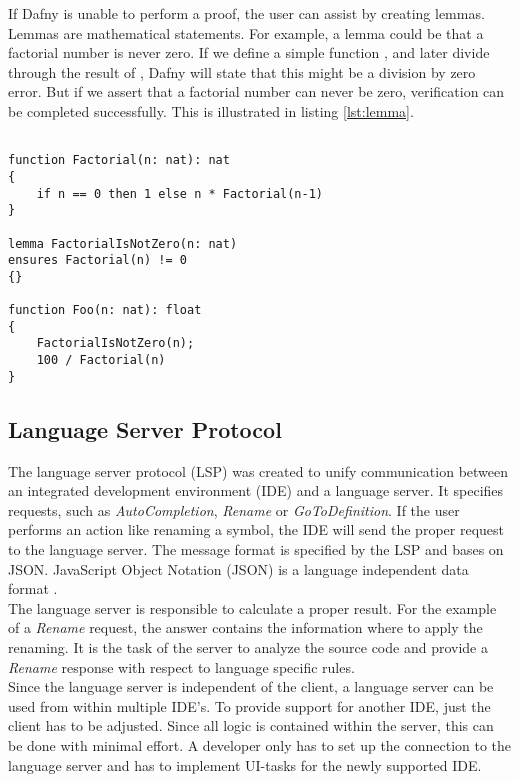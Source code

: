 If Dafny is unable to perform a proof, the user can assist by creating lemmas.
Lemmas are mathematical statements.
For example, a lemma could be that a factorial number is never zero.
If we define a simple function , and later divide through the result of , Dafny will state that this might be a division by zero error.
But if we assert that a factorial number can never be zero, verification can be completed successfully.
This is illustrated in listing \ref{lst:lemma}.
\begin{lstlisting}[language=dafny, caption={Lemma Example for Factorial}, captionpos=b, label={lst:lemma}]

function Factorial(n: nat): nat
{
    if n == 0 then 1 else n * Factorial(n-1)
}

lemma FactorialIsNotZero(n: nat)
ensures Factorial(n) != 0
{}

function Foo(n: nat): float
{
    FactorialIsNotZero(n);
    100 / Factorial(n)
}
\end{lstlisting}

\subsection{Language Server Protocol}
The language server protocol (LSP) was created to unify communication between an integrated development environment (IDE) and a language server. 
It specifies requests, such as \textit{AutoCompletion}, \textit{Rename} or \textit{GoToDefinition}.
If the user performs an action like renaming a symbol, the IDE will send the proper request to the language server.
The message format is specified by the LSP and bases on JSON. 
JavaScript Object Notation (JSON) is a language independent data format \cite{json}. \\

The language server is responsible to calculate a proper result.
For the example of a \textit{Rename} request, the answer contains the information where to apply the renaming.
It is the task of the server to analyze the source code and provide a \textit{Rename} response with respect to language specific rules.\\

Since the language server is independent of the client, a language server can be used from within multiple IDE's.
To provide support for another IDE, just the client has to be adjusted.
Since all logic is contained within the server, this can be done with minimal effort.
A developer only has to set up the connection to the language server and has to implement UI-tasks for the newly supported IDE.

